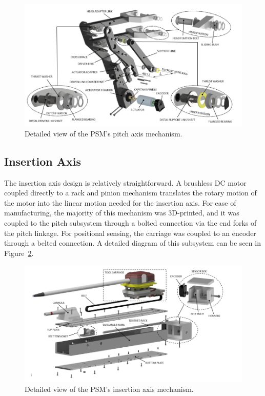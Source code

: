 \begin{figure}[htb!]
    \centering
    \includegraphics[width=1.0\linewidth]{figures/pitch_detailed.png}
    \caption{Detailed view of the PSM's pitch axis mechanism. \cite{walder2022design}}
    \label{fig:pitch_detailed}
\end{figure}

\subsection{Insertion Axis}

The insertion axis design is relatively straightforward. A brushless DC motor coupled directly to a rack and pinion mechanism translates the rotary motion of the motor into the linear motion needed for the insertion axis. For ease of manufacturing, the majority of this mechanism was 3D-printed, and it was coupled to the pitch subsystem through a bolted connection via the end forks of the pitch linkage. For positional sensing, the carriage was coupled to an encoder through a belted connection. A detailed diagram of this subsystem can be seen in Figure~\ref{fig:insertion_detailed}.

\begin{figure}[htb!]
    \centering
    \includegraphics[width=1.0\linewidth]{figures/insertion_detailed.png}
    \caption{Detailed view of the PSM's insertion axis mechanism. \cite{walder2022design}}
    \label{fig:insertion_detailed}
\end{figure}

